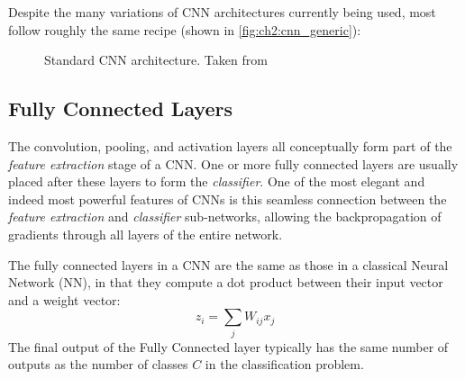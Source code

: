   Despite the many variations of CNN architectures currently being used, most
  follow roughly the same recipe (shown in \autoref{fig:ch2:cnn_generic}):
  \begin{figure}
    \centering
      \caption[Standard CNN architecture]
              {Standard CNN architecture. Taken
              from~\citep{lecun_gradient-based_1998}}\label{fig:ch2:cnn_generic}
  \end{figure}

\subsection{Fully Connected Layers}\label{sec:ch2:cnn_fullyconnected}
  The convolution, pooling, and activation layers all
  conceptually form part of the \emph{feature extraction} stage of a CNN. One
  or more fully connected layers are usually placed after these layers to form
  the \emph{classifier}. One of the most elegant and indeed most powerful
  features of CNNs is this seamless connection between the \emph{feature
  extraction} and \emph{classifier} sub-networks, allowing the backpropagation
  of gradients through all layers of the entire network.

  The fully connected layers in a CNN are the same as those in a classical
  Neural Network (NN), in that they compute a dot product between their input
  vector and a weight vector:
  \begin{equation}
    z_i = \sum_{j} W_{ij}x_j
  \end{equation}
  The final output of the Fully Connected layer typically has the same number
  of outputs as the number of classes $C$ in the classification problem.

